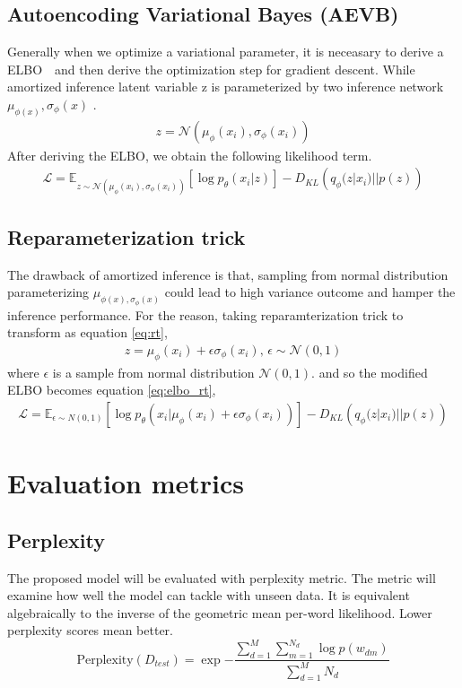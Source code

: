 \subsection{Autoencoding Variational Bayes (AEVB)}
Generally when we optimize a variational parameter, it is neceasary to derive a ELBO　and then derive the optimization step for gradient descent. While amortized inference latent variable z is parameterized by two inference network  $ \mu_{\phi(x)},\sigma_{\phi}(x) $ .
\begin{align}
z = \mathcal{N}(\mu_{\phi}(x_i), \sigma_{\phi}(x_i))
\end{align}
After deriving the ELBO, we obtain the following likelihood term.
\begin{align}
\mathcal{L}=\mathbb{E}_{z\sim\mathcal{N}(\mu_{\phi}(x_i),\sigma_\phi(x_i))}\left[\log p_\theta(x_i|z)\right]-D_{KL}\left(q_\phi(z|x_i)||p(z)\right)
\end{align}
\subsection{Reparameterization trick}
The drawback of amortized inference is that, sampling from normal distribution parameterizing $ \mu_{\phi(x),\sigma_{\phi}(x)} $ could lead to high variance outcome and hamper the inference performance. For the reason, taking reparamterization trick\cite{kingma_auto-encoding_2014} to transform as equation \ref{eq:rt},
\begin{align}\label{eq:rt}
z= \mu_{\phi}(x_i)+\epsilon\sigma_\phi(x_i)\text{, }\epsilon\sim\mathcal{N}(0,1)
\end{align}
where $ \epsilon $ is a sample from normal distribution $ \mathcal{N}(0,1) $. and so the modified ELBO becomes equation \ref{eq:elbo_rt},
\begin{align}\label{eq:elbo_rt}
\mathcal{L}=\mathbb{E}_{\epsilon\sim N(0,1)}\left[\log p_\theta(x_i|\mu_{\phi}(x_i)+\epsilon\sigma_\phi(x_i))\right]-D_{KL}\left(q_\phi(z|x_i)||p(z)\right)
\end{align}
\section{Evaluation metrics}
\subsection{Perplexity}The proposed model will be evaluated with perplexity metric. The metric will examine how well the model can tackle with unseen data. It is equivalent algebraically to the inverse of the geometric mean per-word likelihood. Lower perplexity scores mean better.\begin{equation*}
\text{Perplexity}(D_{test})=\exp{{-\frac{\sum_{d=1}^{M}\sum_{m=1}^{N_d}\log p(w_{dm})}{\sum_{d=1}^{M}N_d}}}
\end{equation*}
